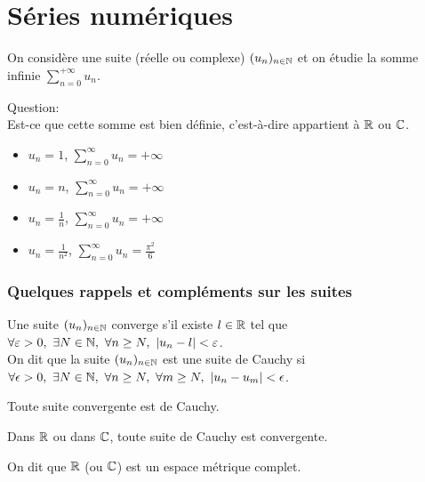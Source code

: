 \documentclass[../main.tex]{subfile}
\begin{document}
\part{Séries numériques}
On considère une suite (réelle ou complexe) $(u_n)_{n\in \mathbb{N}}$ et on étudie la somme infinie $\sum\limits_{n = 0}^{+\infty} u_n$.\\
\begin{rema}
	Question:\\
	Est-ce que cette somme est bien définie, c'est-à-dire appartient à $\mathbb{R}$ ou $\mathbb{C}$.
\end{rema}

\begin{ex}
\begin{itemize}
	\item $u_n = 1$, $\sum\limits_{n = 0}^\infty u_n = +\infty$
	\item $u_n = n$, $\sum\limits_{n = 0}^\infty u_n = +\infty$
	\item $u_n = \frac{1}{n}$, $\sum\limits_{n = 0}^\infty u_n = +\infty$
	\item $u_n = \frac{1}{n^2}$, $\sum\limits_{n = 0}^\infty u_n = \frac{\pi^2}{6}$
\end{itemize}
\end{ex}

\section{Quelques rappels et compléments sur les suites}
Une suite $(u_n)_{n\in \mathbb{N}}$ converge s'il existe $l \in \mathbb{R}$ tel que $\forall \varepsilon > 0, \ \exists N \in \mathbb{N}, \ \forall n \geq N, \ |u_n - l| < \varepsilon$.\\
On dit que la suite $(u_n)_{n\in \mathbb{N}}$ est une suite de Cauchy si $\forall \epsilon > 0, \ \exists N \in \NN, \ \forall n \geq N, \ \forall m \geq N, \ |u_n - u_m| < \epsilon$.\\

\begin{prop}
	Toute suite convergente est de Cauchy.
\end{prop}

\begin{prop}
	Dans $\mathbb{R}$ ou dans $\mathbb{C}$, toute suite de Cauchy est convergente.
\end{prop}

On dit que $\mathbb{R}$ (ou $\mathbb{C}$) est un espace métrique complet.\\
\end{document}
